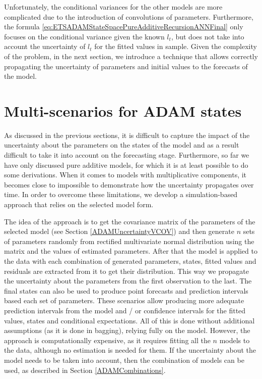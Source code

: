 \documentclass[
]{book}
\theoremstyle{definition}
\theoremstyle{definition}
\theoremstyle{definition}
\theoremstyle{definition}
\theoremstyle{remark}
\begin{document}
Unfortunately, the conditional variances for the other models are more complicated due to the introduction of convolutions of parameters. Furthermore, the formula \eqref{eq:ETSADAMStateSpacePureAdditiveRecursionANNFinal} only focuses on the conditional variance given the known \(l_t\), but does not take into account the uncertainty of \(l_t\) for the fitted values in sample. Given the complexity of the problem, in the next section, we introduce a technique that allows correctly propagating the uncertainty of parameters and initial values to the forecasts of the model.

\hypertarget{adamRefitted}{%
\section{Multi-scenarios for ADAM states}\label{adamRefitted}}

As discussed in the previous sections, it is difficult to capture the impact of the uncertainty about the parameters on the states of the model and as a result difficult to take it into account on the forecasting stage. Furthermore, so far we have only discussed pure additive models, for which it is at least possible to do some derivations. When it comes to models with multiplicative components, it becomes close to impossible to demonstrate how the uncertainty propagates over time. In order to overcome these limitations, we develop a simulation-based approach that relies on the selected model form.

The idea of the approach is to get the covariance matrix of the parameters of the selected model (see Section \ref{ADAMUncertaintyVCOV}) and then generate \(n\) sets of parameters randomly from rectified multivariate normal distribution using the matrix and the values of estimated parameters. After that the model is applied to the data with each combination of generated parameters, states, fitted values and residuals are extracted from it to get their distribution. This way we propagate the uncertainty about the parameters from the first observation to the last. The final states can also be used to produce point forecasts and prediction intervals based each set of parameters. These scenarios allow producing more adequate prediction intervals from the model and / or confidence intervals for the fitted values, states and conditional expectations. All of this is done without additional assumptions (as it is done in bagging), relying fully on the model. However, the approach is computationally expensive, as it requires fitting all the \(n\) models to the data, although no estimation is needed for them. If the uncertainty about the model needs to be taken into account, then the combination of models can be used, as described in Section \ref{ADAMCombinations}.
\end{document}
